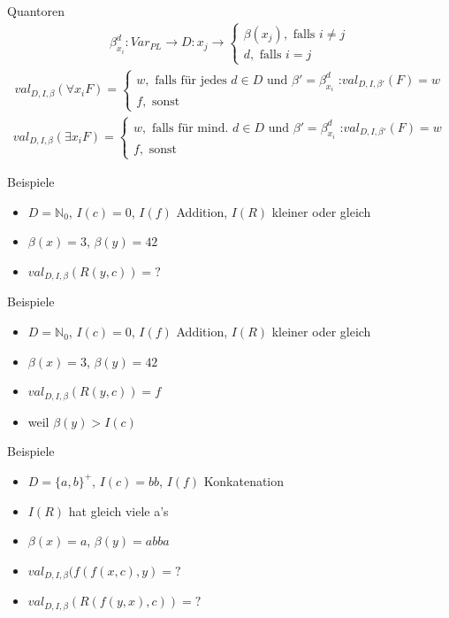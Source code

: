 \begin{frame}{Quantoren}
  \begin{align*}
    \beta^d_{x_i}:Var_{PL}\rightarrow D: x_j \rightarrow \begin{cases} \beta(x_j), \text{ falls } i\neq j\\ 
    d, \text{ falls } i=j\end{cases}
  \end{align*}
  \begin{align*}
    val_{D,I,\beta}(\forall x_i F)= \begin{cases} w, \text{ falls für jedes $d\in D$ und $\beta '=\beta_{x_i}^d$ :} val_{D,I,\beta '}(F)=w \\ 
    f, \text{ sonst} \end{cases}
  \end{align*}
  \begin{align*}
    val_{D,I,\beta}(\exists x_i F)= \begin{cases} w, \text{ falls für mind. $d\in D$ und $\beta '=\beta_{x_i}^d$ :} val_{D,I,\beta '}(F)=w \\ 
    f, \text{ sonst} \end{cases}
  \end{align*}
\end{frame}

\begin{frame}{Beispiele}
  \begin{itemize}
    \item $D=\mathbb{N}_0$, $I(c)=0$, $I(f)$ Addition, $I(R)$ kleiner oder gleich
    \item $\beta(x)=3$, $\beta(y)=42$
    \item $val_{D,I,\beta}(R(y,c))=?$
  \end{itemize}
\end{frame}

\begin{frame}{Beispiele}
  \begin{itemize}
    \item $D=\mathbb{N}_0$, $I(c)=0$, $I(f)$ Addition, $I(R)$ kleiner oder gleich
    \item $\beta(x)=3$, $\beta(y)=42$
    \item $val_{D,I,\beta}(R(y,c))=f$
    \item weil $\beta(y)> I(c)$
  \end{itemize}
\end{frame}

\begin{frame}{Beispiele}
  \begin{itemize}
    \item $D=\{a,b\}^+$, $I(c)=bb$, $I(f)$ Konkatenation
    \item $I(R)$ hat gleich viele a's
    \item $\beta(x)=a$, $\beta(y)=abba$
    \item $val_{D,I,\beta}(f(f(x,c),y)=?$
    \item $val_{D,I,\beta}(R(f(y,x),c))=?$
  \end{itemize}
\end{frame}

